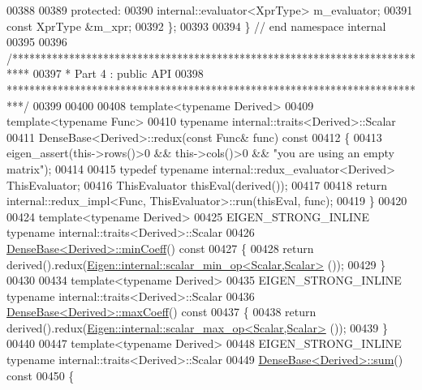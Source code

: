 \begin{DoxyCode}
00388   
00389 \textcolor{keyword}{protected}:
00390   internal::evaluator<XprType> m\_evaluator;
00391   \textcolor{keyword}{const} XprType &m\_xpr;
00392 \};
00393 
00394 \} \textcolor{comment}{// end namespace internal}
00395 
00396 \textcolor{comment}{/***************************************************************************}
00397 \textcolor{comment}{* Part 4 : public API}
00398 \textcolor{comment}{***************************************************************************/}
00399 
00400 
00408 \textcolor{keyword}{template}<\textcolor{keyword}{typename} Derived>
00409 \textcolor{keyword}{template}<\textcolor{keyword}{typename} Func>
00410 \textcolor{keyword}{typename} internal::traits<Derived>::Scalar
00411 DenseBase<Derived>::redux(\textcolor{keyword}{const} Func& func)\textcolor{keyword}{ const}
00412 \textcolor{keyword}{}\{
00413   eigen\_assert(this->rows()>0 && this->cols()>0 && \textcolor{stringliteral}{"you are using an empty matrix"});
00414 
00415   \textcolor{keyword}{typedef} \textcolor{keyword}{typename} internal::redux\_evaluator<Derived> ThisEvaluator;
00416   ThisEvaluator thisEval(derived());
00417   
00418   \textcolor{keywordflow}{return} internal::redux\_impl<Func, ThisEvaluator>::run(thisEval, func);
00419 \}
00420 
00424 \textcolor{keyword}{template}<\textcolor{keyword}{typename} Derived>
00425 EIGEN\_STRONG\_INLINE \textcolor{keyword}{typename} internal::traits<Derived>::Scalar
00426 \hyperlink{group___core___module_a6634944be3d4fef551b57ffad30467f2}{DenseBase<Derived>::minCoeff}()\textcolor{keyword}{ const}
00427 \textcolor{keyword}{}\{
00428   \textcolor{keywordflow}{return} derived().redux(\hyperlink{struct_eigen_1_1internal_1_1scalar__min__op}{Eigen::internal::scalar\_min\_op<Scalar,Scalar>}
      ());
00429 \}
00430 
00434 \textcolor{keyword}{template}<\textcolor{keyword}{typename} Derived>
00435 EIGEN\_STRONG\_INLINE \textcolor{keyword}{typename} internal::traits<Derived>::Scalar
00436 \hyperlink{group___core___module_ac0d151ec47eb7a44a3a5ba1587ddbeb4}{DenseBase<Derived>::maxCoeff}()\textcolor{keyword}{ const}
00437 \textcolor{keyword}{}\{
00438   \textcolor{keywordflow}{return} derived().redux(\hyperlink{struct_eigen_1_1internal_1_1scalar__max__op}{Eigen::internal::scalar\_max\_op<Scalar,Scalar>}
      ());
00439 \}
00440 
00447 \textcolor{keyword}{template}<\textcolor{keyword}{typename} Derived>
00448 EIGEN\_STRONG\_INLINE \textcolor{keyword}{typename} internal::traits<Derived>::Scalar
00449 \hyperlink{group___core___module_a4dee689c76ff86da9d8e49950604597b}{DenseBase<Derived>::sum}()\textcolor{keyword}{ const}
00450 \textcolor{keyword}{}\{

\end{DoxyCode}
